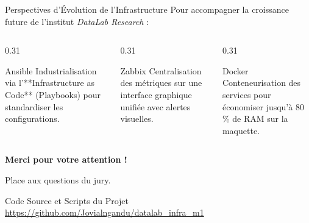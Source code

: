 \begin{frame}{Perspectives d'Évolution de l'Infrastructure}
    Pour accompagner la croissance future de l'institut \textit{DataLab Research} :

    \vspace{0.3cm}
    \begin{columns}[T]
        \begin{column}{0.31\textwidth}
            \begin{block}{Ansible}
                \small
                Industrialisation via l'**Infrastructure as Code** (Playbooks) pour standardiser les configurations.
            \end{block}
        \end{column}

        \begin{column}{0.31\textwidth}
            \begin{block}{Zabbix}
                \small
                Centralisation des métriques sur une interface graphique unifiée avec alertes visuelles.
            \end{block}
        \end{column}

        \begin{column}{0.31\textwidth}
            \begin{block}{Docker}
                \small
                Conteneurisation des services pour économiser jusqu'à 80\,\% de RAM sur la maquette.
            \end{block}
        \end{column}
    \end{columns}
\end{frame}

\begin{frame}[plain]
    \centering
    \vspace{2cm}
    {\huge \color{blue!70!black} \textbf{Merci pour votre attention !}}
    
    \vspace{1cm}
    {\large Place aux questions du jury.}
    
    \vspace{1.5cm}
    \begin{block}{Code Source et Scripts du Projet}
        \centering
        \tiny \url{https://github.com/Jovialngandu/datalab_infra_m1}
    \end{block}
\end{frame}